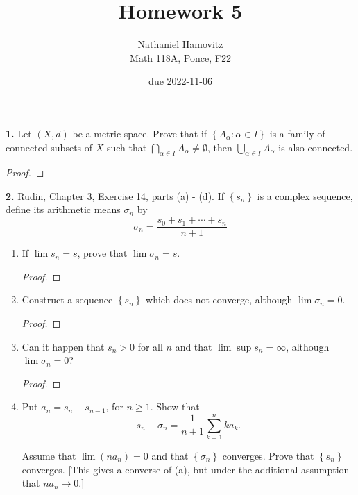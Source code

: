 \documentclass{article}
\newcommand{\set}[1]{\left\{ #1 \right\}}
\begin{document}
\renewcommand{\labelenumi}{(\alph{enumi})}


\title{Homework 5} %
\author{Nathaniel Hamovitz\\Math 118A, Ponce, F22}
\date{due 2022-11-06}

\maketitle

\textbf{1. }
Let $(X, d)$ be a metric space. Prove that if $\set{A_\alpha : \alpha \in I}$ is a family of connected subsets of $X$ such that $\displaystyle \bigcap_{\alpha \in I} A_\alpha \ne \emptyset$, then $\displaystyle \bigcup_{\alpha \in I} A_\alpha$ is also connected.

\begin{proof}
    
\end{proof}

\newpage %


\textbf{2. }
Rudin, Chapter 3, Exercise 14, parts (a) - (d). If $\set{s_n}$ is a complex sequence, define its arithmetic means $\sigma_n$ by
$$\sigma_n = \frac{s_0 + s_1 + \cdots + s_n}{n + 1}$$

\begin{enumerate}
    \item 
    If $\lim s_n = s$, prove that $\lim \sigma_n = s$.
    \begin{proof}
        
    \end{proof}


    \item 
    Construct a sequence $\set{s_n}$ which does not converge, although $\lim \sigma_n = 0$.
    \begin{proof}
        
    \end{proof}


    \item
    Can it happen that $s_n > 0$ for all $n$ and that $\lim \sup s_n = \infty$, although $\lim \sigma_n = 0$?
    \begin{proof}
        
    \end{proof}


    \item
    Put $a_n = s_n - s_{n - 1}$, for $n \ge 1$. Show that
    $$s_n - \sigma_n = \frac{1}{n + 1} \sum_{k = 1}^n k a_k.$$

    Assume that $\lim (n a_n) = 0$ and that $\set{\sigma_n}$ converges. Prove that $\set{s_n}$ converges. [This gives a converse of (a), but under the additional assumption that $n a_n \to 0$.]
\end{enumerate}
\end{document}

